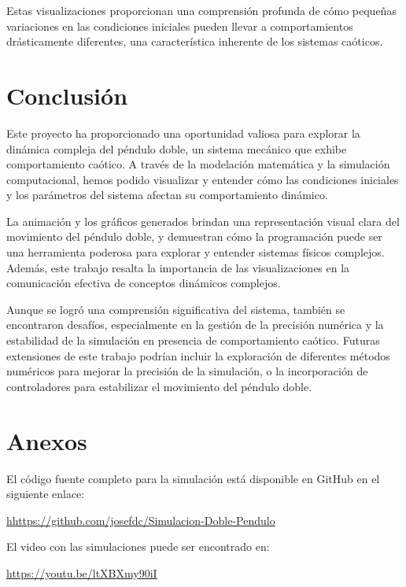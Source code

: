 \documentclass[12pt]{article}
\begin{document}
Estas visualizaciones proporcionan una comprensión profunda de cómo pequeñas variaciones en las condiciones iniciales pueden llevar a comportamientos drásticamente diferentes, una característica inherente de los sistemas caóticos.


\section{Conclusión}

Este proyecto ha proporcionado una oportunidad valiosa para explorar la dinámica compleja del péndulo doble, un sistema mecánico que exhibe comportamiento caótico. A través de la modelación matemática y la simulación computacional, hemos podido visualizar y entender cómo las condiciones iniciales y los parámetros del sistema afectan su comportamiento dinámico.

La animación y los gráficos generados brindan una representación visual clara del movimiento del péndulo doble, y demuestran cómo la programación puede ser una herramienta poderosa para explorar y entender sistemas físicos complejos. Además, este trabajo resalta la importancia de las visualizaciones en la comunicación efectiva de conceptos dinámicos complejos.

Aunque se logró una comprensión significativa del sistema, también se encontraron desafíos, especialmente en la gestión de la precisión numérica y la estabilidad de la simulación en presencia de comportamiento caótico. Futuras extensiones de este trabajo podrían incluir la exploración de diferentes métodos numéricos para mejorar la precisión de la simulación, o la incorporación de controladores para estabilizar el movimiento del péndulo doble.



\section{Anexos}

El código fuente completo para la simulación está disponible en GitHub en el siguiente enlace:
\begin{center}
    \url{hhttps://github.com/josefdc/Simulacion-Doble-Pendulo}
\end{center}

El video con las simulaciones puede ser encontrado en:
\begin{center}
    \url{https://youtu.be/ltXBXmy90iI}
\end{center}
\end{document}
